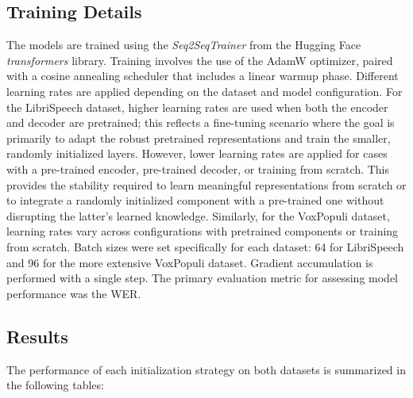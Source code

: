 \subsection{Training Details}
\label{sec:experimental-setup-1}
The models are trained using the \textit{Seq2SeqTrainer} from the Hugging Face \textit{transformers} library. Training involves the use of the AdamW \cite{loshchilov2019decoupledweightdecayregularization} optimizer, paired with a cosine annealing scheduler that includes a linear warmup phase. Different learning rates are applied depending on the dataset and model configuration. For the LibriSpeech dataset, higher learning rates are used when both the encoder and decoder are pretrained; this reflects a fine-tuning scenario where the goal is primarily to adapt the robust pretrained representations and train the smaller, randomly initialized layers. However, lower learning rates are applied for cases with a pre-trained encoder, pre-trained decoder, or training from scratch. This provides the stability required to learn meaningful representations from scratch or to integrate a randomly initialized component with a pre-trained one without disrupting the latter's learned knowledge. Similarly, for the VoxPopuli dataset, learning rates vary across configurations with pretrained components or training from scratch. Batch sizes were set specifically for each dataset: 64 for LibriSpeech and 96 for the more extensive VoxPopuli dataset. Gradient accumulation is performed with a single step. The primary evaluation metric for assessing model performance was the WER.


\subsection{Results}
The performance of each initialization strategy on both datasets is summarized in the following tables:

